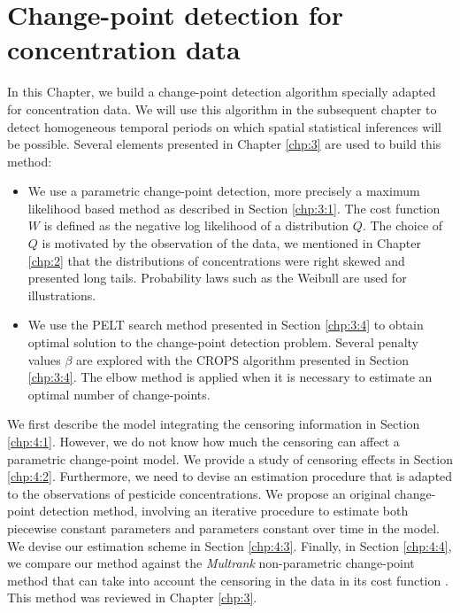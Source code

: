 \chapter{Change-point detection for concentration data}\label{chp:4}

\minitoc

\clearpage

In this Chapter, we build a change-point detection algorithm specially adapted for concentration data. We will use this algorithm in the subsequent chapter to detect homogeneous temporal periods on which spatial statistical inferences will be possible. Several elements presented in Chapter \ref{chp:3} are used to build this method:  
\begin{itemize}
\item We use a parametric change-point detection, more precisely a maximum likelihood based method as described in Section \ref{chp:3:1}. The cost function $W$ is defined as the negative log likelihood of a distribution $Q$. The choice of $Q$ is motivated by the observation of the data, we mentioned in Chapter \ref{chp:2} that the distributions of concentrations were right skewed and presented long tails. Probability laws such as the Weibull are used for illustrations.  
\item We use the PELT search method presented in Section \ref{chp:3:4} to obtain optimal solution to the change-point detection problem. Several penalty values $\beta$ are explored with the CROPS algorithm presented in Section \ref{chp:3:4}. The elbow method is applied when it is necessary to estimate an optimal number of change-points.   
\end{itemize}
We first describe the model integrating the censoring information in Section \ref{chp:4:1}. However, we do not know how much the censoring can affect a parametric change-point model. We provide a study of censoring effects in Section \ref{chp:4:2}. Furthermore, we need to devise an estimation procedure that is adapted to the observations of pesticide concentrations. We propose an original change-point detection method, involving an iterative procedure to estimate both piecewise constant parameters and parameters constant over time in the model.
We devise our estimation scheme in Section \ref{chp:4:3}. Finally, in Section \ref{chp:4:4}, we compare our method against the \textit{Multrank} non-parametric change-point method that can take into account the censoring in the data in its cost function \citep{lung2015}. This method was reviewed in Chapter \ref{chp:3}. 

